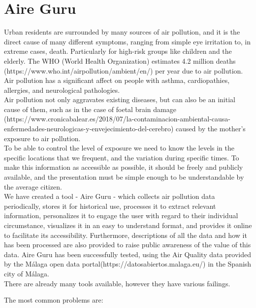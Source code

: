 \section{Aire Guru}

Urban residents are surrounded by many sources of air pollution, and it is the direct cause of many different symptoms,
ranging from simple eye irritation 
to, in extreme cases, death. Particularly for high-risk groups like children and the elderly.
The WHO (World Health Organization) estimates 4.2 million deaths
(https://www.who.int/airpollution/ambient/en/) per year due to air pollution.
Air pollution has a significant affect on people with asthma, cardiopathies, allergies, and neurological pathologies.\\


Air pollution not only aggravates existing diseases, but can also be an initial cause of them, such as in the case of foetal brain
damage (https://www.cronicabalear.es/2018/07/la-contaminacion-ambiental-causa-enfermedades-neurologicas-y-envejecimiento-del-cerebro)
caused by the mother's exposure to air pollution.\\


To be able to control the level of exposure we need to know the levels
in the specific locations that we frequent, and the variation during specific times.
To make this information as accessible as possible, it should be freely and publicly available, and the presentation
must be simple enough to be understandable by the average citizen.\\


We have created a tool - Aire Guru - which collects air pollution data periodically, stores it for historical use, 
processes it to extract relevant information, personalizes it to engage the user with regard to their individual
circumstance, visualizes it in an easy to understand format, and provides it online to facilitate its accessibility. Furthermore,
descriptions of all the data and how it has been processed are also provided to raise public awareness of the value
of this data. Aire Guru has been successfully tested, using the Air Quality data provided
by the Málaga open data portal(https://datosabiertos.malaga.eu/) in the Spanish city of Málaga.\\


There are already many tools available, however they have various failings.

The most common problems are:

